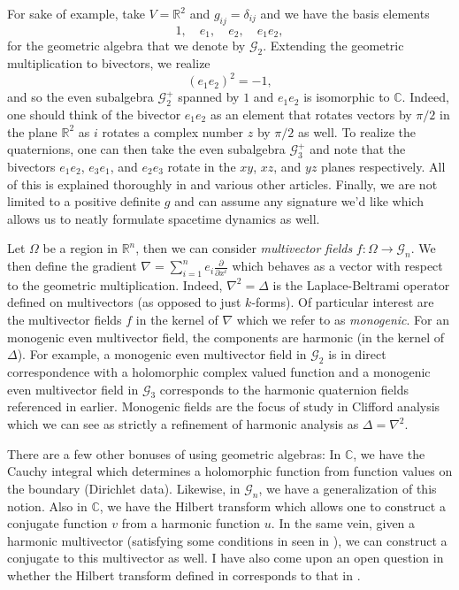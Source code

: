 \documentclass{article}
\newcommand{\C}{\mathbb{C}}
\newcommand{\R}{\mathbb{R}}
\begin{document}
For sake of example, take $V=\R^2$ and $g_{ij}=\delta_{ij}$ and we have the basis elements
\[
1,\quad e_1,\quad e_2, \quad e_1 e_2,
\]
for the geometric algebra that we denote by $\mathcal{G}_2$. Extending the geometric multiplication to bivectors, we realize 
\[
(e_1 e_2)^2 = -1,
\]
and so the even subalgebra $\mathcal{G}_2^+$ spanned by $1$ and $e_1 e_2$ is isomorphic to $\C$. Indeed, one should think of the bivector $e_1 e_2$ as an element that rotates vectors by $\pi/2$ in the plane $\R^2$ as $i$ rotates a complex number $z$ by $\pi/2$ as well. To realize the quaternions, one can then take the even subalgebra $\mathcal{G}_3^+$ and note that the bivectors $e_1 e_2$, $e_3 e_1$, and $e_2 e_3$ rotate in the $xy$, $xz$, and $yz$ planes respectively. All of this is explained thoroughly in \cite{doran_geometric_2003, hestenes_clifford_1984} and various other articles. Finally, we are not limited to a positive definite $g$ and can assume any signature we'd like which allows us to neatly formulate spacetime dynamics as well.

Let $\Omega$ be a region in $\R^n$, then we can consider \emph{multivector fields} $f\colon \Omega \to \mathcal{G}_n$. We then define the gradient $\nabla = \sum_{i=1}^n e_i \frac{\partial}{\partial x^i}$ which behaves as a vector with respect to the geometric multiplication. Indeed, $\nabla^2=\Delta$ is the Laplace-Beltrami operator defined on multivectors (as opposed to just $k$-forms). Of particular interest are the multivector fields $f$ in the kernel of $\nabla$ which we refer to as \emph{monogenic}. For an monogenic even multivector field, the components are harmonic (in the kernel of $\Delta$). For example, a monogenic even multivector field in $\mathcal{G}_2$ is in direct correspondence with a holomorphic complex valued function and a monogenic even multivector field in $\mathcal{G}_3$ corresponds to the harmonic quaternion fields referenced in \cite{belishev_algebras_2019} earlier. Monogenic fields are the focus of study in Clifford analysis which we can see as strictly a refinement of harmonic analysis as $\Delta = \nabla^2$.

There are a few other bonuses of using geometric algebras: In $\C$, we have the Cauchy integral which determines a holomorphic function from function values on the boundary (Dirichlet data). Likewise, in $\mathcal{G}_n$, we have a generalization of this notion. Also in $\C$, we have the Hilbert transform which allows one to construct a conjugate function $v$ from a harmonic function $u$. In the same vein, given a harmonic multivector (satisfying some conditions in seen in \cite{belishev_dirichlet_2008}), we can construct a conjugate to this multivector as well. I have also come upon an open question in whether the Hilbert transform defined in \cite{belishev_dirichlet_2008} corresponds to that in \cite{brackx_hilbert_2008}.
\end{document}
